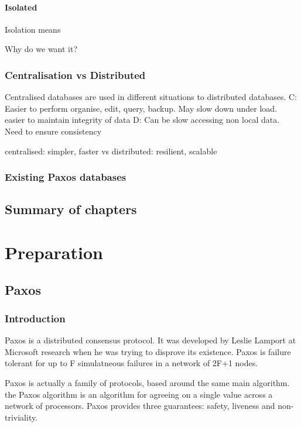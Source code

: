 \documentclass[12pt,twoside,notitlepage]{report}
\begin{document}
\subsubsection*{Isolated}

Isolation means 

Why do we want it?

\subsection{Centralisation vs Distributed}

Centralised databases are used in different situations to distributed databases.
C: Easier to perform organise, edit, query, backup. May slow down under load.
easier to maintain integrity of data
D: Can be slow accessing non local data. Need to ensure consistency

centralised: simpler, faster vs distributed: resilient, scalable


\subsection{Existing Paxos databases}

\section{Summary of chapters}

\cleardoublepage

\chapter{Preparation}

\section{Paxos}

\subsection{Introduction}

Paxos is a distributed consensus protocol. It was developed by Leslie Lamport at Microsoft
research when he was trying to disprove its existence. Paxos is failure tolerant for up to F
simulatneous failures in a network of 2F+1 nodes.

Paxos is actually a family of protocols, based around the same main algorithm. the Paxos algorithm
is an algorithm for agreeing on a single value across a network of processors. Paxos provides
three guarantees: safety, liveness and non-triviality.
\end{document}
